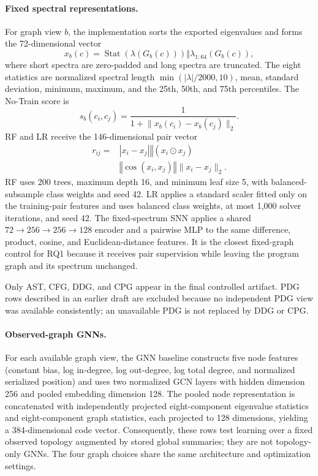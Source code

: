 \documentclass[authoryear,final,5p,times,twocolumn]{elsarticle}
\newcommand{\concat}{\mathbin\Vert}
\newcommand{\added}[1]{{\color{green!50!black}#1}}
\theoremstyle{plain}
\begin{document}
\paragraph{Fixed spectral representations.}
For graph view $b$, the implementation sorts the exported eigenvalues and forms
the 72-dimensional vector
\begin{equation}
x_b(c)=\operatorname{Stat}(\lambda(G_b(c)))
\concat\lambda_{1:64}(G_b(c)),
\label{eq:fixed_spectral_vector}
\end{equation}
where short spectra are zero-padded and long spectra are truncated. The eight
statistics are \added{normalized} spectral length
\added{$\min(|\lambda|/2000,10)$}, mean, standard deviation, minimum, maximum,
and the 25th, 50th, and 75th percentiles.
The No-Train score is
\begin{equation}
s_b(c_i,c_j)=
\frac{1}{1+\lVert x_b(c_i)-x_b(c_j)\rVert_2}.
\label{eq:no_train_score}
\end{equation}
RF and LR receive the \added{146-dimensional} pair vector
\begin{equation}
\begin{aligned}
r_{ij}={}&|x_i-x_j|\concat(x_i\odot x_j)\\
&{}\concat\cos(x_i,x_j)
\concat\lVert x_i-x_j\rVert_2.
\end{aligned}
\label{eq:fixed_pair_features}
\end{equation}
RF uses 200 trees, maximum depth 16, and minimum leaf size 5\added{, with
balanced-subsample class weights and seed 42}. \added{LR applies a standard
scaler fitted only on the training-pair features and uses balanced class weights,
at most 1,000 solver iterations, and seed 42. The fixed-spectrum SNN applies a
shared $72\!\rightarrow\!256\!\rightarrow\!256\!\rightarrow\!128$ encoder and
a pairwise MLP to the same difference, product, cosine, and Euclidean-distance
features.} It is the closest fixed-graph control for RQ1 because it receives pair
supervision while leaving the program graph and its spectrum unchanged.

\added{Only AST, CFG, DDG, and CPG appear in the final controlled artifact. PDG
rows described in an earlier draft are excluded because no independent PDG view
was available consistently; an unavailable PDG is not replaced by DDG or CPG.}

\paragraph{Observed-graph GNNs.}
\added{For each available graph view, the GNN baseline constructs five node
features (constant bias, log in-degree, log out-degree, log total degree, and
normalized serialized position) and uses two normalized GCN layers with hidden
dimension 256 and pooled embedding dimension 128. The pooled node representation
is concatenated with independently projected eight-component eigenvalue
statistics and eight-component graph statistics, each projected to 128
dimensions, yielding a 384-dimensional code vector. Consequently, these
rows test learning over a fixed observed topology augmented by stored global
summaries; they are not topology-only GNNs. The four graph choices share the same
architecture and optimization settings.}
\end{document}
